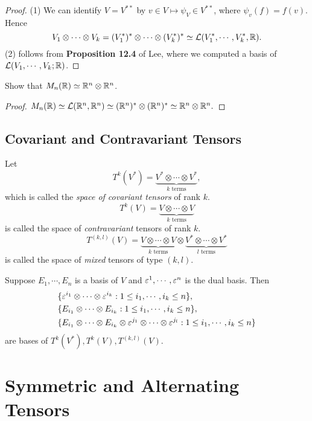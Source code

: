 \begin{proof}
    (1) We can identify $V = V^{**}$ by $v \in V \mapsto \psi_V \in V^{**}$, where $\psi_v(f) = f(v).$ Hence 
    $$V_1 \otimes \cdots \otimes V_k = (V_1^*)^* \otimes \cdots \otimes (V_k^*)^* \simeq \mathcal{L}(V_1^*,\cdots,V_k^*,\mathbb{R}). $$
    (2) follows from \textbf{Proposition 12.4} of Lee, where we computed a basis of $\mathcal{L}(V_1,\cdots,V_k;\mathbb{R})$. 
\end{proof}
\begin{example}
    Show that $M_n(\mathbb{R}) \simeq \mathbb{R}^n \otimes \mathbb{R}^n$. 
\end{example}
\begin{proof}
    $M_n(\mathbb{R}) \simeq \mathcal{L}(\mathbb{R}^n, \mathbb{R}^n) \simeq (\mathbb{R}^n)^* \otimes (\mathbb{R}^n)^* \simeq \mathbb{R}^n \otimes \mathbb{R}^n.$
\end{proof}

\subsection{Covariant and Contravariant Tensors}
Let  $$T^k(V^*) = \underbrace{V^* \otimes \cdots \otimes V^*}_{k \text{ terms}},$$
which is called the \textit{space of covariant tensors} of rank $k$. 
$$T^k(V) = \underbrace{V \otimes \cdots \otimes V}_{k \text{ terms}}$$ 
is called the space of \textit{contravariant} tensors of rank $k$. 
$$T^{(k,l)}(V) = \underbrace{V \otimes \cdots \otimes V}_{k \text{ terms}} \otimes 
\underbrace{V^* \otimes \cdots \otimes V^*}_{l \text{ terms}} $$ is called the space of \textit{mixed} tensors of type $(k,l)$. 

\begin{corollary}
    Suppose $E_1, \cdots, E_n$ is a basis of $V$ and $\varepsilon^1, \cdots, \varepsilon^n$ is the dual basis. Then 
    \begin{align*}
    &\{\varepsilon^{i_1} \otimes \cdots \otimes \varepsilon^{i_k}: 1 \leq i_1, \cdots, i_k \leq n \}, \\  
    &\{E_{i_1} \otimes \cdots \otimes E_{i_k}:  1 \leq i_1, \cdots, i_k \leq n\}, \\
    &\{E_{i_1} \otimes \cdots \otimes E_{i_k} \otimes \varepsilon^{j_1} \otimes \cdots \otimes \varepsilon^{j_l}:  1 \leq i_1, \cdots, i_k \leq n\}
    \end{align*}
    are bases of $T^k(V^*), T^k(V), T^{(k,l)}(V)$. 
\end{corollary}

\section{Symmetric and Alternating Tensors}
